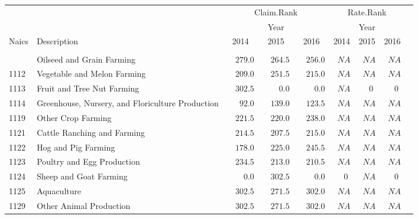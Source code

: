 \documentclass[9pt, oneside]{article}   	%
\begin{document}
\begin{longtable}{lp{3.5 in}ccccccc}
\label{Table: 10c.MPr}\\
\hline
                         \toprule
 &  & \multicolumn{3}{c}{Claim.Rank} & \multicolumn{3}{c}{Rate.Rank} \\ 
 &  & \multicolumn{3}{c}{Year} & \multicolumn{3}{c}{Year} \\ 
Naics  & Description & 2014 & 2015 & 2016 & 2014 & 2015 & \multicolumn{1}{c}{2016} \\ 
\midrule\\ [-1\normalbaselineskip]\hline\endhead\hline\endfoot
1111  & Oilseed and Grain Farming & $\phantom{00}279.0$ & $\phantom{00}264.5$ & $\phantom{00}256.0$ & $\phantom{0}NA$ & $\phantom{0}NA$ & $\phantom{0}NA$ \\
1112  & Vegetable and Melon Farming & $\phantom{00}209.0$ & $\phantom{00}251.5$ & $\phantom{00}215.0$ & $\phantom{0}NA$ & $\phantom{0}NA$ & $\phantom{0}NA$ \\
1113  & Fruit and Tree Nut Farming & $\phantom{00}302.5$ & $\phantom{0000}0.0$ & $\phantom{0000}0.0$ & $\phantom{0}NA$ & $\phantom{00}0$ & $\phantom{00}0$ \\
1114  & Greenhouse, Nursery, and Floriculture Production & $\phantom{000}92.0$ & $\phantom{00}139.0$ & $\phantom{00}123.5$ & $\phantom{0}NA$ & $\phantom{0}NA$ & $\phantom{0}NA$ \\
1119  & Other Crop Farming & $\phantom{00}221.5$ & $\phantom{00}220.0$ & $\phantom{00}238.0$ & $\phantom{0}NA$ & $\phantom{0}NA$ & $\phantom{0}NA$ \\
1121  & Cattle Ranching and Farming & $\phantom{00}214.5$ & $\phantom{00}207.5$ & $\phantom{00}215.0$ & $\phantom{0}NA$ & $\phantom{0}NA$ & $\phantom{0}NA$ \\
1122  & Hog and Pig Farming & $\phantom{00}178.0$ & $\phantom{00}225.0$ & $\phantom{00}245.5$ & $\phantom{0}NA$ & $\phantom{0}NA$ & $\phantom{0}NA$ \\
1123  & Poultry and Egg Production & $\phantom{00}234.5$ & $\phantom{00}213.0$ & $\phantom{00}210.5$ & $\phantom{0}NA$ & $\phantom{0}NA$ & $\phantom{0}NA$ \\
1124  & Sheep and Goat Farming & $\phantom{0000}0.0$ & $\phantom{00}302.5$ & $\phantom{0000}0.0$ & $\phantom{00}0$ & $\phantom{0}NA$ & $\phantom{00}0$ \\
1125  & Aquaculture & $\phantom{00}302.5$ & $\phantom{00}271.5$ & $\phantom{00}302.0$ & $\phantom{0}NA$ & $\phantom{0}NA$ & $\phantom{0}NA$ \\
1129  & Other Animal Production & $\phantom{00}302.5$ & $\phantom{00}271.5$ & $\phantom{00}302.0$ & $\phantom{0}NA$ & $\phantom{0}NA$ & $\phantom{0}NA$ \\

\end{longtable}
\end{document}
